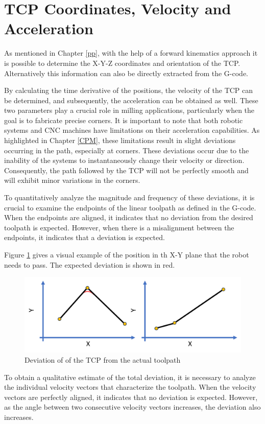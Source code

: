 \section{TCP Coordinates, Velocity and Acceleration}\label{CVA}
As mentioned in Chapter \ref{pp}, with the help of a forward kinematics approach it is possible to determine the X-Y-Z coordinates and orientation of the TCP. Alternatively this information can also be directly extracted from the G-code.

By calculating the time derivative of the positions, the velocity of the TCP can be determined, and subsequently, the acceleration can be obtained as well. These two parameters play a crucial role in milling applications, particularly when the goal is to fabricate precise corners. It is important to note that both robotic systems and CNC machines have limitations on their acceleration capabilities. As highlighted in Chapter \ref{CPM}, these limitations result in slight deviations occurring in the path, especially at corners. These deviations occur due to the inability of the systems to instantaneously change their velocity or direction. Consequently, the path followed by the TCP will not be perfectly smooth and will exhibit minor variations in the corners.


To quantitatively analyze the magnitude and frequency of these deviations, it is crucial to examine the endpoints of the linear toolpath as defined in the G-code. When the endpoints are aligned, it indicates that no deviation from the desired toolpath is expected. However, when there is a misalignment between the endpoints, it indicates that a deviation is expected.

Figure \ref{devi} gives a visual example of the position in th X-Y plane that the robot needs to pass. The expected deviation is shown in red.

\begin{figure}[H]
	\centerline{\includegraphics[width=.651\textwidth]{figures/uber.png}}
	\caption{Deviation of of the TCP from the actual toolpath}
	\label{devi}
\end{figure}

To obtain a qualitative estimate of the total deviation, it is necessary to analyze the individual velocity vectors that characterize the toolpath. When the velocity vectors are perfectly aligned, it indicates that no deviation is expected. However, as the angle between two consecutive velocity vectors increases, the deviation also increases.

